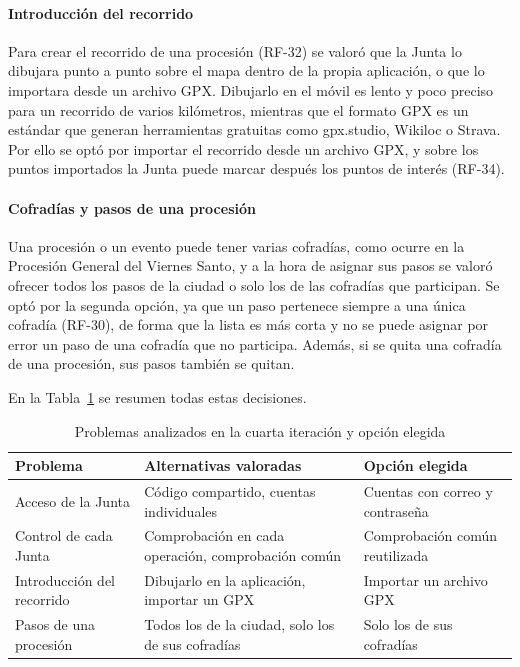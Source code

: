 \paragraph{Introducción del recorrido}
Para crear el recorrido de una procesión (RF-32) se valoró que la Junta lo dibujara punto a punto sobre el mapa dentro de la propia aplicación, o que lo importara desde un archivo GPX. Dibujarlo en el móvil es lento y poco preciso para un recorrido de varios kilómetros, mientras que el formato GPX es un estándar que generan herramientas gratuitas como gpx.studio, Wikiloc o Strava. Por ello se optó por importar el recorrido desde un archivo GPX, y sobre los puntos importados la Junta puede marcar después los puntos de interés (RF-34).

\paragraph{Cofradías y pasos de una procesión}
Una procesión o un evento puede tener varias cofradías, como ocurre en la Procesión General del Viernes Santo, y a la hora de asignar sus pasos se valoró ofrecer todos los pasos de la ciudad o solo los de las cofradías que participan. Se optó por la segunda opción, ya que un paso pertenece siempre a una única cofradía (RF-30), de forma que la lista es más corta y no se puede asignar por error un paso de una cofradía que no participa. Además, si se quita una cofradía de una procesión, sus pasos también se quitan.

En la Tabla~\ref{tab:alternativasIt4} se resumen todas estas decisiones.

\begin{table}[H]
\centering
\small
\begin{tabular}{|p{3.6cm}|p{5.6cm}|p{4.4cm}|}
\hline
\textbf{Problema} & \textbf{Alternativas valoradas} & \textbf{Opción elegida} \\
\hline
Acceso de la Junta & Código compartido, cuentas individuales & Cuentas con correo y contraseña \\
\hline
Control de cada Junta & Comprobación en cada operación, comprobación común & Comprobación común reutilizada \\
\hline
Introducción del recorrido & Dibujarlo en la aplicación, importar un GPX & Importar un archivo GPX \\
\hline
Pasos de una procesión & Todos los de la ciudad, solo los de sus cofradías & Solo los de sus cofradías \\
\hline
\end{tabular}
\caption{Problemas analizados en la cuarta iteración y opción elegida}
\label{tab:alternativasIt4}
\end{table}

